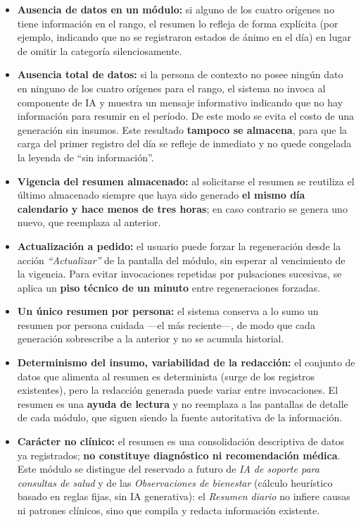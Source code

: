 \documentclass[a4paper,12pt]{article}
\begin{document}
    \begin{itemize}
        \item \textbf{Ausencia de datos en un módulo:} si alguno de los cuatro orígenes no tiene información en el rango, el resumen lo refleja de forma explícita (por ejemplo, indicando que no se registraron estados de ánimo en el día) en lugar de omitir la categoría silenciosamente.
        \item \textbf{Ausencia total de datos:} si la persona de contexto no posee ningún dato en ninguno de los cuatro orígenes para el rango, el sistema no invoca al componente de IA y muestra un mensaje informativo indicando que no hay información para resumir en el período. De este modo se evita el costo de una generación sin insumos. Este resultado \textbf{tampoco se almacena}, para que la carga del primer registro del día se refleje de inmediato y no quede congelada la leyenda de ``sin información''.
        \item \textbf{Vigencia del resumen almacenado:} al solicitarse el resumen se reutiliza el último almacenado siempre que haya sido generado \textbf{el mismo día calendario y hace menos de tres horas}; en caso contrario se genera uno nuevo, que reemplaza al anterior.
        \item \textbf{Actualización a pedido:} el usuario puede forzar la regeneración desde la acción \textit{``Actualizar''} de la pantalla del módulo, sin esperar al vencimiento de la vigencia. Para evitar invocaciones repetidas por pulsaciones sucesivas, se aplica un \textbf{piso técnico de un minuto} entre regeneraciones forzadas.
        \item \textbf{Un único resumen por persona:} el sistema conserva a lo sumo un resumen por persona cuidada —el más reciente—, de modo que cada generación sobrescribe a la anterior y no se acumula historial.
        \item \textbf{Determinismo del insumo, variabilidad de la redacción:} el conjunto de datos que alimenta al resumen es determinista (surge de los registros existentes), pero la redacción generada puede variar entre invocaciones. El resumen es una \textbf{ayuda de lectura} y no reemplaza a las pantallas de detalle de cada módulo, que siguen siendo la fuente autoritativa de la información.
        \item \textbf{Carácter no clínico:} el resumen es una consolidación descriptiva de datos ya registrados; \textbf{no constituye diagnóstico ni recomendación médica}. Este módulo se distingue del reservado a futuro de \textit{IA de soporte para consultas de salud} y de las \textit{Observaciones de bienestar} (cálculo heurístico basado en reglas fijas, sin IA generativa): el \textit{Resumen diario} no infiere causas ni patrones clínicos, sino que compila y redacta información existente.
    \end{itemize}
\end{document}
